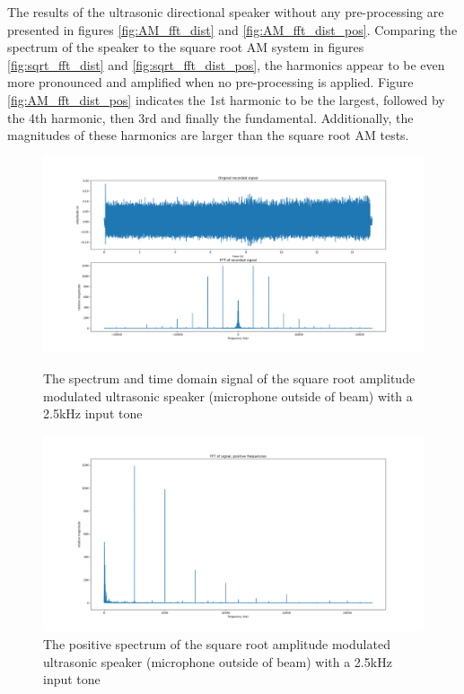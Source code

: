 The results of the ultrasonic directional speaker without any pre-processing are presented in figures \ref{fig:AM_fft_dist} and \ref{fig:AM_fft_dist_pos}. Comparing the spectrum of the speaker to the square root AM system in figures \ref{fig:sqrt_fft_dist} and \ref{fig:sqrt_fft_dist_pos}, the harmonics appear to be even more pronounced and amplified when no pre-processing is applied. Figure \ref{fig:AM_fft_dist_pos} indicates the 1st harmonic to be the largest, followed by the 4th harmonic, then 3rd and finally the fundamental. Additionally, the magnitudes of these harmonics are larger than the square root AM tests.
\begin{figure}[ht!]
    \centering
    \begin{minipage}{0.49\textwidth}
        \centering
        \includegraphics[width=\textwidth]{Figures/Testing/Distortion/SQRT_fft_sig.png}
        \caption{The spectrum and time domain signal of the square root amplitude modulated ultrasonic speaker (microphone outside of beam) with a 2.5kHz input tone}
        \label{fig:sqrt_fft_dist_outofbeam}
    \end{minipage}\hfill
    \begin{minipage}{0.49\textwidth}
        \centering
        \includegraphics[width=\textwidth]{Figures/Testing/Distortion/SQRT_fft_pos.png}
        \caption{The positive spectrum of the square root amplitude modulated ultrasonic speaker (microphone outside of beam) with a 2.5kHz input tone}
        \label{fig:sqrt_fft_dist_pos_outofbeam}
    \end{minipage}
\end{figure}

